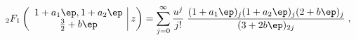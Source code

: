 \begin{equation}
_{2}F_1\left(\begin{array}{c|}
1+a_1\ep, 1+a_2 \ep\\
\tfrac{3}{2} + b \ep  \end{array} ~z \right)
= \sum_{j=0}^{\infty} \frac{u^j}{j!}\;
\frac{(1+a_1\ep)_j (1+a_2\ep)_j (2+b\ep)_j}  
{(3+2b\ep)_{2j}} \; ,
\end{equation}

